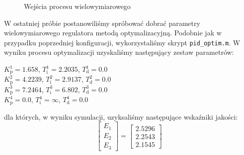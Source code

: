 \begin{figure}
    \begin{subfigure}[b]{\textwidth}
        \centering
    \end{subfigure}

    \caption{Wejścia procesu wielowymiarowego}
    \label{pro_pid_konf2_in2}
\end{figure}
\FloatBarrier

W ostatniej próbie postanowiliśmy spróbować dobrać parametry wielowymiarowego 
regulatora metodą optymalizacyjną. Podobnie jak w przypadku poprzedniej konfiguracji,
wykorzystaliśmy skrypt \verb+pid_optim.m+. W wyniku procesu optymalizacji uzyskaliśmy następujący
zestaw parametrów:

\begin{center}
    $K^{\num{1}}_{\mathrm{p}} = \num{1.658}$, $T^{\num{1}}_{\mathrm{i}} = \num{2.2035}$, $T^{\num{1}}_{\mathrm{d}} = \num{0.0}$ \\
    $K^{\num{2}}_{\mathrm{p}} = \num{4.2239}$, $T^{\num{2}}_{\mathrm{i}} = \num{2.9137}$, $T^{\num{2}}_{\mathrm{d}} = \num{0.0}$ \\
    $K^{\num{3}}_{\mathrm{p}} = \num{7.2464}$, $T^{\num{3}}_{\mathrm{i}} = \num{6.802}$, $T^{\num{3}}_{\mathrm{d}} = \num{0.0}$ \\
    $K^{\num{4}}_{\mathrm{p}} = \num{0.0}$, $T^{\num{4}}_{\mathrm{i}} = \infty$, $T^{\num{4}}_{\mathrm{d}} = \num{0.0}$ \\
\end{center}

dla których, w wyniku symulacji, uzyksaliśmy następujące wskaźniki jakości:\\

\[
\begin{bmatrix}
    E_{\mathrm{1}} \\
    E_{\mathrm{2}} \\
    E_{\mathrm{3}} 
\end{bmatrix}
= 
\begin{bmatrix}
    \num{2.5296} \\
    \num{2.2543} \\
    \num{2.1545}
\end{bmatrix}
\]

